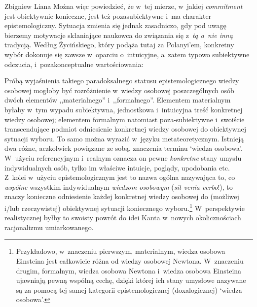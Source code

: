 \begin{artplenv}{Zbigniew Liana}
Można więc powiedzieć, że w~tej mierze, w~jakiej \textit{commitment} jest obiektywnie konieczne, jest też pozasubiektywne i~ma charakter epistemologiczny. Sytuacja zmienia się jednak zasadniczo, gdy pod uwagę bierzemy motywacje skłaniające naukowca do związania się z~\textit{tą a~nie inną} tradycją. Według Życińskiego, który podąża tutaj za Polanyi'em, konkretny wybór dokonuje się zawsze w~oparciu o~intuicyjne, a~zatem typowo subiektywne odczucia, i~pozakonceptualne wartościowania:


Próbą wyjaśnienia takiego paradoksalnego statusu epistemologicznego wiedzy osobowej mogłoby być rozróżnienie w~wiedzy osobowej poszczególnych osób dwóch elementów ,,materialnego'' i~,,formalnego''. Elementem materialnym byłaby w~tym wypadu subiektywna, jednostkowa i~intuicyjna treść konkretnej wiedzy osobowej; elementem formalnym natomiast poza-subiektywne i~swoiście transcendujące podmiot odniesienie konkretnej wiedzy osobowej do obiektywnej sytuacji wyboru. To samo można wyrazić w~języku metateoretycznym. Istnieją dwa różne, aczkolwiek powiązane ze sobą, znaczenia terminu ‘wiedza osobowa'. W~użyciu referencyjnym i~realnym oznacza on pewne \textit{konkretne} stany umysłu indywidualnych osób, tylko im właściwe intuicje, poglądy, upodobania etc. Z~kolei w~użyciu epistemologicznym jest to nazwa ogólna nazywająca to, co \textit{wspólne} wszystkim indywidualnym \textit{wiedzom osobowym} (\textit{sit venia verbo}!), to znaczy konieczne odniesienie każdej konkretnej wiedzy osobowej do (możliwej i/lub rzeczywistej) obiektywnej sytuacji koniecznego wyboru.\footnote{Przykładowo, w~znaczeniu pierwszym, materialnym, wiedza osobowa Einsteina jest całkowicie różna od wiedzy osobowej Newtona. W~znaczeniu drugim, formalnym, wiedza osobowa Newtona i~wiedza osobowa Einsteina ujawniają pewną wspólną cechę, dzięki której ich stany umysłowe nazywane są za pomocą tej samej kategorii epistemologicznej (doxalogicznej) ‘wiedza osobowa'.} W~perspektywie realistycznej byłby to swoisty powrót do idei Kanta w~nowych okolicznościach racjonalizmu umiarkowanego.


\end{artplenv}

